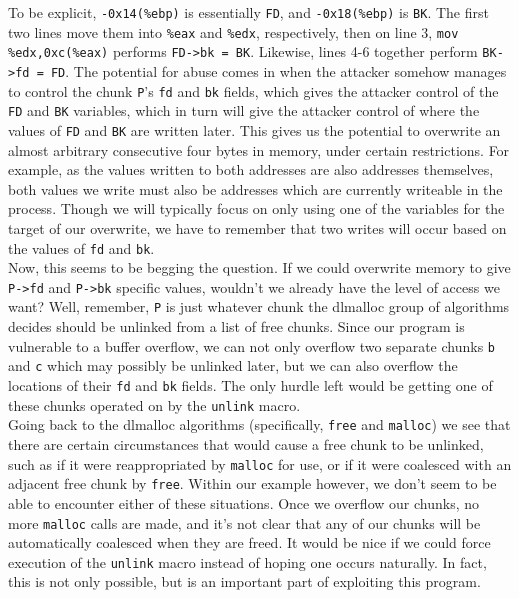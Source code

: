 To be explicit, \texttt{-0x14(\%ebp)} is essentially \texttt{FD}, and
\texttt{-0x18(\%ebp)} is \texttt{BK}. The first two lines move them into
\texttt{\%eax} and \texttt{\%edx}, respectively, then on line 3,
\texttt{mov \%edx,0xc(\%eax)} performs \texttt{FD->bk = BK}. Likewise,
lines 4-6 together perform \texttt{BK->fd = FD}. The potential for
abuse comes in when the attacker somehow manages to control
the chunk \texttt{P}'s \texttt{fd} and \texttt{bk} fields, which 
gives the attacker control of the \texttt{FD} and \texttt{BK} variables,
which in turn will give the attacker control of where the values
of \texttt{FD} and \texttt{BK} are written later. This gives us
the potential to overwrite an almost arbitrary consecutive four bytes
in memory, under certain restrictions. For example, as the values written
to both addresses are also addresses themselves, both values we
write must also be addresses which are currently writeable in the process.
Though we will typically focus on only using one of the variables
for the target of our overwrite, we have to remember that two
writes will occur based on the values of \texttt{fd} and \texttt{bk}.\\

Now, this seems to be begging the question. If we could overwrite memory
to give \texttt{P->fd} and \texttt{P->bk} specific values, wouldn't
we already have the level of access we want? Well, remember, \texttt{P}
is just whatever chunk the dlmalloc group of algorithms decides should
be unlinked from a list of free chunks. Since our program is vulnerable
to a buffer overflow, we can not only overflow two separate chunks
\texttt{b} and \texttt{c} which may possibly be unlinked later, but we can also
overflow the locations of their \texttt{fd} and \texttt{bk} fields. The
only hurdle left would be getting one of these chunks operated
on by the \texttt{unlink} macro.\\

Going back to the dlmalloc algorithms (specifically, \texttt{free} and \texttt{malloc})
we see that there are certain circumstances that would cause a free chunk
to be unlinked, such as if it were reappropriated by \texttt{malloc} for
use, or if it were coalesced with an adjacent free chunk by \texttt{free}.
Within our example however, we don't seem to be able to encounter either
of these situations. Once we overflow our chunks, no more \texttt{malloc}
calls are made, and it's not clear that any of our chunks will be
automatically coalesced when they are freed. It would be nice if we could
force execution of the \texttt{unlink} macro instead of hoping one
occurs naturally. In fact, this is not only possible, but is an important
part of exploiting this program.\\

